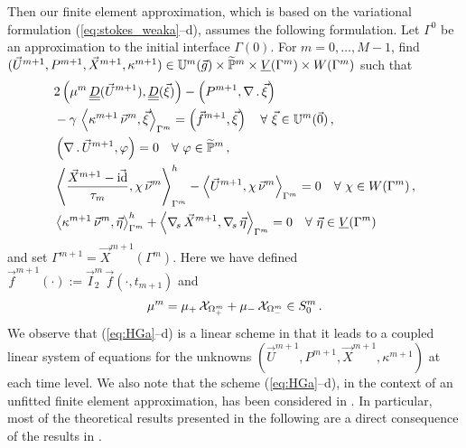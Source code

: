 \sloppy Then our finite element approximation, which is based on the variational
formulation (\ref{eq:stokes_weaka}--d), assumes the following formulation. Let
$\Gamma^0$ be an approximation to the initial interface $\Gamma(0)$. For
$m=0,\ldots, M-1$, find ${(\vec U^{m+1}, P^{m+1}, \vec X^{m+1}, \kappa^{m+1})
\in \mathbb{U}^{m}(\vec{g})\times \widetilde{\mathbb{P}}^m \times \underline{V}(\Gamma^m) \times W(\Gamma^m)}$ such that
\begin{subequations}
\begin{align}
& 2\left(\mu^m\,\mat D(\vec U^{m+1}), \mat D(\vec \xi) \right)
- \left(P^{m+1}, \nabla\,.\,\vec \xi\right) \nonumber \\
& - \gamma\,\left\langle \kappa^{m+1}\,\vec\nu^m,\vec\xi\right\rangle_{\Gamma^m}
= \left(\vec f^{m+1},\vec \xi\right) \quad \forall\ \vec\xi \in
\uspacedisc{0}{m}\,, \label{eq:HGa}\\
& \left(\nabla\,.\,\vec U^{m+1}, \varphi\right)  = 0
\quad \forall\ \varphi \in \pnormspace^m\,,\label{eq:HGb} \\
&  \left\langle \frac{\vec X^{m+1} - \vec\id}{\tau_m} ,\chi\,\vec\nu^m
\right\rangle_{\Gamma^m}^h - \left\langle \vec U^{m+1}, \chi\,\vec\nu^m
\right\rangle_{\Gamma^m}  = 0 \quad \forall\ \chi \in \Wh\,, \label{eq:HGc} \\
& \left\langle \kappa^{m+1}\,\vec\nu^m, \vec\eta \right\rangle_{\Gamma^m}^h
+ \left\langle \nabs\,\vec X^{m+1}, \nabs\,\vec \eta \right\rangle_{\Gamma^m} =
0 \quad \forall\ \vec\eta \in \Vh \label{eq:HGd}
\end{align}
\end{subequations}
and set $\Gamma^{m+1} = \vec X^{m+1}(\Gamma^m)$. Here we have defined
$\vec f^{m+1}(\cdot) := \vec I^m_2\,\vec f(\cdot,t_{m+1})$ and
\begin{equation}
\mu^m =\mu_+\,\mathrm{\mathcal{X}}_{\Omega^m_+} + \mu_-\,\mathrm{\mathcal{X}}_{\Omega^m_-}\in S^m_0\,.
\end{equation}
We observe that (\ref{eq:HGa}--d) is a linear scheme in that it leads to a
coupled linear system of equations for the unknowns
$(\vec U^{m+1}, P^{m+1}, \vec X^{m+1}, \kappa^{m+1})$ at each time level.
We also note that the scheme (\ref{eq:HGa}--d), in the context of an
unfitted finite element approximation, has been considered in \cite{spurious}.
In particular, most of the theoretical results presented in the following
are a direct consequence of the results in \cite{spurious}.

